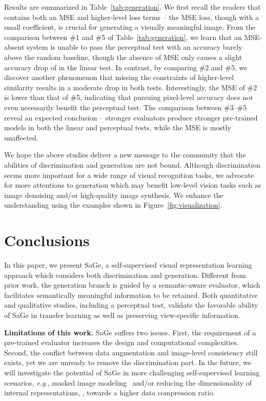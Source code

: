 \documentclass[10pt,twocolumn,letterpaper]{article}
\begin{document}
Results are summarized in Table~\ref{tab:generation}. We first recall the readers that  contains both an MSE and higher-level loss terms -- the MSE loss, though with a small coefficient, is crucial for generating a visually meaningful image. From the comparison between \#1 and \#5 of Table~\ref{tab:generation}, we learn that an MSE-absent system is unable to pass the perceptual test with an accuracy barely above the random baseline, though the absence of MSE only causes a slight accuracy drop of  in the linear test. In contrast, by comparing \#2 and \#5, we discover another phenomenon that missing the constraints of higher-level similarity results in a moderate drop in both tests. Interestingly, the MSE of \#2 is lower than that of \#5, indicating that pursuing pixel-level accuracy does not even necessarily benefit the perceptual test. The comparison between \#3--\#5 reveal an expected conclusion -- stronger evaluators produce stronger pre-trained models in both the linear and perceptual tests, while the MSE is mostly unaffected.

We hope the above studies deliver a new message to the community that the abilities of discrimination and generation are not bound. Although discrimination seems more important for a wide range of visual recognition tasks, we advocate for more attentions to generation which may benefit low-level vision tasks such as image denoising and/or high-quality image synthesis. We enhance the understanding using the examples shown in Figure~\ref{fig:visualization}.

\section{Conclusions}

In this paper, we present SaGe, a self-supervised visual representation learning approach which considers both discrimination and generation. Different from prior work, the generation branch is guided by a semantic-aware evaluator, which facilitates semantically meaningful information to be retained. Both quantitative and qualitative studies, including a perceptual test, validate the favorable ability of SaGe in transfer learning as well as preserving view-specific information.

\vspace{0.1cm}\noindent
\textbf{Limitations of this work.} SaGe suffers two issues. First, the requirement of a pre-trained evaluator increases the design and computational complexities. Second, the conflict between data augmentation and image-level consistency still exists, yet we are unready to remove the discrimination part. In the future, we will investigate the potential of SaGe in more challenging self-supervised learning scenarios, \textit{e.g.}, masked image modeling~\cite{bao2021beit} and/or reducing the dimensionality of internal representations, , towards a higher data compression ratio.
\end{document}
